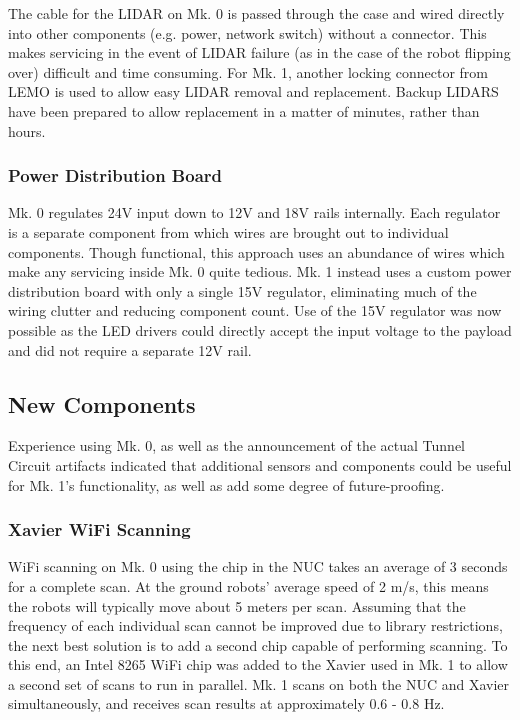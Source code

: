The cable for the LIDAR on Mk. 0 is passed through the case and wired directly into other components (e.g. power, network switch) without a connector. This makes servicing in the event of LIDAR failure (as in the case of the robot flipping over) difficult and time consuming. For Mk. 1, another locking connector from LEMO is used to allow easy LIDAR removal and replacement. Backup LIDARS have been prepared to allow replacement in a matter of minutes, rather than hours.

\subsubsection{Power Distribution Board}

Mk. 0 regulates 24V input down to 12V and 18V rails internally. Each regulator is a separate component from which wires are brought out to individual components. Though functional, this approach uses an abundance of wires which make any servicing inside Mk. 0 quite tedious. Mk. 1 instead uses a custom power distribution board with only a single 15V regulator, eliminating much of the wiring clutter and reducing component count. Use of the 15V regulator was now possible as the LED drivers could directly accept the input voltage to the payload and did not require a separate 12V rail.

\subsection{New Components}

Experience using Mk. 0, as well as the announcement of the actual Tunnel Circuit artifacts indicated that additional sensors and components could be useful for Mk. 1's functionality, as well as add some degree of future-proofing.

\subsubsection{Xavier WiFi Scanning}

WiFi scanning on Mk. 0 using the chip in the NUC takes an average of 3 seconds for a complete scan. At the ground robots' average speed of 2 m/s, this means the robots will typically move about 5 meters per scan. Assuming that the frequency of each individual scan cannot be improved due to library restrictions, the next best solution is to add a second chip capable of performing scanning. To this end, an Intel 8265 WiFi chip was added to the Xavier used in Mk. 1 to allow a second set of scans to run in parallel. Mk. 1 scans on both the NUC and Xavier simultaneously, and receives scan results at approximately 0.6 - 0.8 Hz.

